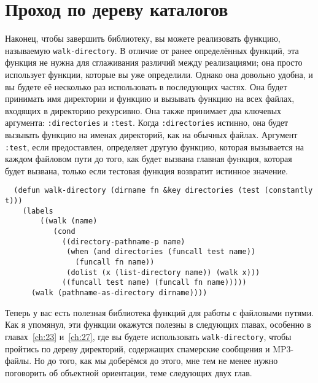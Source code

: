 \section{Проход по дереву каталогов}

Наконец, чтобы завершить библиотеку, вы можете реализовать функцию, называемую
\lstinline{walk-directory}. В отличие от ранее определённых функций, эта функция не нужна для
сглаживания различий между реализациями; она просто использует функции, которые вы уже
определили. Однако она довольно удобна, и вы будете её несколько раз использовать в
последующих частях. Она будет принимать имя директории и функцию и вызывать функцию на
всех файлах, входящих в директорию рекурсивно. Она также принимает два ключевых аргумента:
\lstinline{:directories} и \lstinline{:test}. Когда \lstinline{:directories} истинно, она будет вызывать
функцию на именах директорий, как на обычных файлах. Аргумент \lstinline{:test}, если
предоставлен, определяет другую функцию, которая вызывается на каждом файловом пути до
того, как будет вызвана главная функция, которая будет вызвана, только если тестовая
функция возвратит истинное значение.

\begin{lstlisting}
  (defun walk-directory (dirname fn &key directories (test (constantly t)))
    (labels
        ((walk (name)
           (cond
             ((directory-pathname-p name)
              (when (and directories (funcall test name))
                (funcall fn name))
              (dolist (x (list-directory name)) (walk x)))
             ((funcall test name) (funcall fn name)))))
      (walk (pathname-as-directory dirname))))
\end{lstlisting}

Теперь у вас есть полезная библиотека функций для работы с файловыми путями. Как я
упомянул, эти функции окажутся полезны в следующих главах, особенно в главах~\ref{ch:23}
и~\ref{ch:27}, где вы будете использовать \lstinline{walk-directory}, чтобы пройтись по
дереву директорий, содержащих спамерские сообщения и MP3-файлы. Но до того, как мы
доберёмся до этого, мне тем не менее нужно поговорить об объектной ориентации, теме
следующих двух глав.

